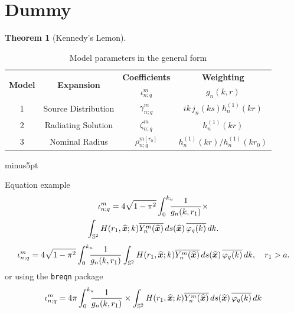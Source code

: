 \documentclass[10pt, twocolumn, twoside]{IEEEtran}
\newcommand{\untsph}{\mathbb{S}^{2}} %
\newcommand{\unit}[1]{\widehat{\bm{#1}}}
\newcommand{\conj}[1]{\overline{#1}} %
\newtheorem{theorem}{Theorem}%
\begin{document}
\section{Dummy}

\begin{theorem}[Kennedy's Lemon]
\label{thm:main}
\lipsum[46]
\end{theorem}

\medskip

\begin{IEEEproof}
\lipsum[47]
\end{IEEEproof}

\begin{table}[tbp]
\renewcommand{\arraystretch}{1.0}
\caption{Model parameters in the general form}
\begin{center}
	\begin{tabular}{@{\,}cccc@{\,}}
		\toprule
			\multirow{2}{*}{\bfseries Model} & \multirow{2}{*}{\bfseries Expansion}
				& \bfseries Coefficients & \bfseries Weighting \\
			& & $\displaystyle\iota_{n;q}^{m}$ & $g_{n}(k,r)$ \\[1mm]
		\midrule
			1 & Source Distribution & $\gamma_{n;q}^{m}$
				& $ik\, j_{n}(ks) h_{n}^{(1)}(kr)$ \\[0.8mm]
			2 & Radiating Solution & $\zeta_{n;q}^{m}$
				& $h_{n}^{(1)}(kr)$ \\[0.8mm]
			3 & Nominal Radius& $\rho_{n;q}^{m[r_{0}]}$
				& $h_{n}^{(1)}(kr)/h_{n}^{(1)}(kr_{0})$ \\[1mm]
		\bottomrule
	\end{tabular}
\end{center}
\label{tab:models}
\end{table}

\newskip\conditionsep
\conditionsep=10pt minus5pt


Equation example
\ifCLASSOPTIONtwocolumn
\begin{multline}
	\iota_{n;q}^{m} = 4\sqrt{1-\pi^{2}}
		\int_{0}^{\mathrlap{k_{u}}\;}
		\frac{1}{g_{n}(k,r_{1})}
		\times \\
	\int_{\untsph} H(r_{1},\unit{x};k)
		\conj{Y_{n}^{m}(\unit{x})}\,ds(\unit{x})\, \conj{\varphi_{q}(k)}\,dk.
\end{multline}
\else
\begin{subequations}
\begin{equation}
	\iota_{n;q}^{m} = 4\sqrt{1-\pi^{2}}
		\int_{0}^{\mathrlap{k_{u}}\;}
		\frac{1}{g_{n}(k,r_{1})} 
	\int_{\untsph} H(r_{1},\unit{x};k)
		\conj{Y_{n}^{m}(\unit{x})}\,ds(\unit{x})\, \conj{\varphi_{q}(k)}\,dk,\quad r_1>a.
\end{equation}
\end{subequations}
\fi
or using the {\tt breqn} package
\begin{dmath}
	\iota_{n;q}^{m} = 4\pi
		\int_{0}^{\mathrlap{k_{u}}\;}
		\frac{1}{g_{n}(k,r_{1})} \times
	\int_{\untsph} H(r_{1},\unit{x};k)
		\conj{Y_{n}^{m}(\unit{x})}\,ds(\unit{x})\, \conj{\varphi_{q}(k)}\,dk%
\end{dmath}
\end{document}
